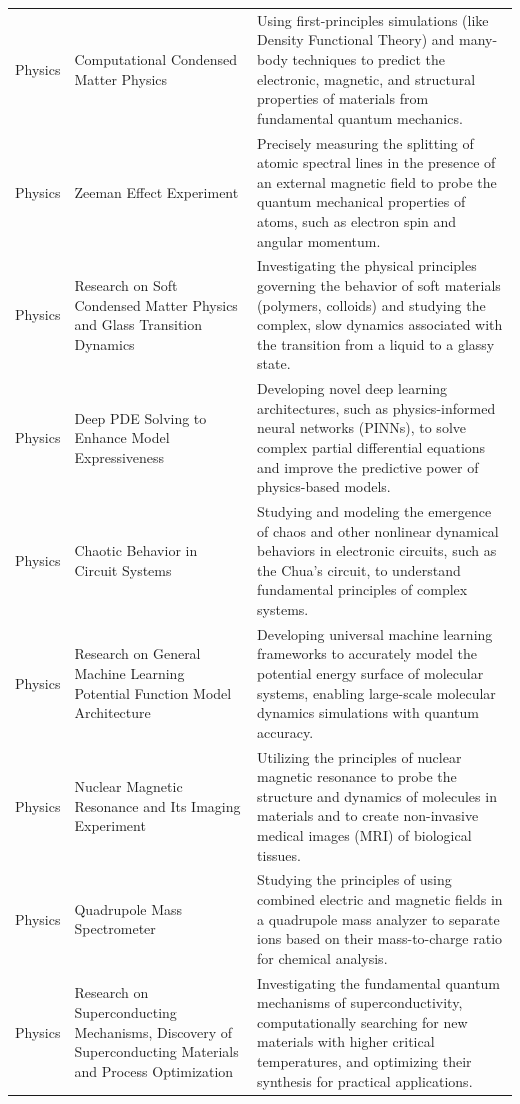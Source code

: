 \begin{longtable}{p{2cm}p{6cm}p{7cm}}
\rowcolor{PhysicsColor} Physics & Computational Condensed Matter Physics & Using first-principles simulations (like Density Functional Theory) and many-body techniques to predict the electronic, magnetic, and structural properties of materials from fundamental quantum mechanics. \\
\rowcolor{PhysicsColor} Physics & Zeeman Effect Experiment & Precisely measuring the splitting of atomic spectral lines in the presence of an external magnetic field to probe the quantum mechanical properties of atoms, such as electron spin and angular momentum. \\
\rowcolor{PhysicsColor} Physics & Research on Soft Condensed Matter Physics and Glass Transition Dynamics & Investigating the physical principles governing the behavior of soft materials (polymers, colloids) and studying the complex, slow dynamics associated with the transition from a liquid to a glassy state. \\
\rowcolor{PhysicsColor} Physics & Deep PDE Solving to Enhance Model Expressiveness & Developing novel deep learning architectures, such as physics-informed neural networks (PINNs), to solve complex partial differential equations and improve the predictive power of physics-based models. \\
\rowcolor{PhysicsColor} Physics & Chaotic Behavior in Circuit Systems & Studying and modeling the emergence of chaos and other nonlinear dynamical behaviors in electronic circuits, such as the Chua's circuit, to understand fundamental principles of complex systems. \\
\rowcolor{PhysicsColor} Physics & Research on General Machine Learning Potential Function Model Architecture & Developing universal machine learning frameworks to accurately model the potential energy surface of molecular systems, enabling large-scale molecular dynamics simulations with quantum accuracy. \\
\rowcolor{PhysicsColor} Physics & Nuclear Magnetic Resonance and Its Imaging Experiment & Utilizing the principles of nuclear magnetic resonance to probe the structure and dynamics of molecules in materials and to create non-invasive medical images (MRI) of biological tissues. \\
\rowcolor{PhysicsColor} Physics & Quadrupole Mass Spectrometer & Studying the principles of using combined electric and magnetic fields in a quadrupole mass analyzer to separate ions based on their mass-to-charge ratio for chemical analysis. \\
\rowcolor{PhysicsColor} Physics & Research on Superconducting Mechanisms, Discovery of Superconducting Materials and Process Optimization & Investigating the fundamental quantum mechanisms of superconductivity, computationally searching for new materials with higher critical temperatures, and optimizing their synthesis for practical applications. \\

\hline
\end{longtable}

